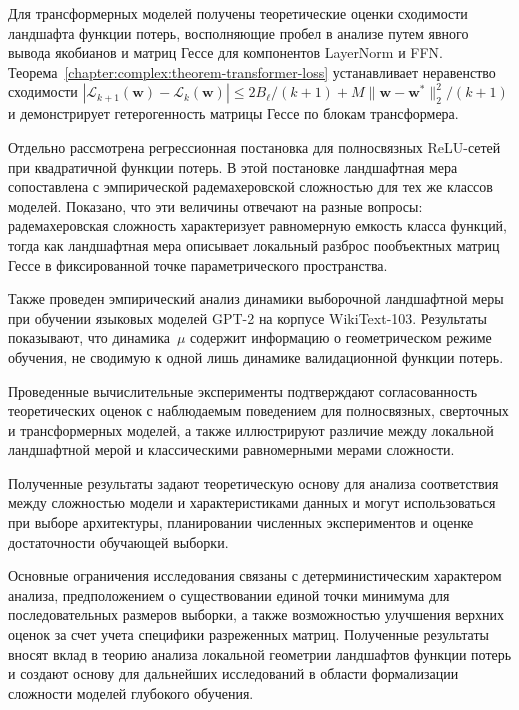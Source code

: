Для трансформерных моделей получены теоретические оценки сходимости ландшафта функции потерь, восполняющие пробел в анализе путем явного вывода якобианов и матриц Гессе для компонентов LayerNorm и FFN. Теорема~\ref{chapter:complex:theorem-transformer-loss} устанавливает неравенство сходимости $|\mathcal{L}_{k+1}(\mathbf{w})-\mathcal{L}_{k}(\mathbf{w})| \le 2B_{\ell}/(k+1) + M\|\mathbf{w}-\mathbf{w}^*\|_2^2/(k+1)$ и демонстрирует гетерогенность матрицы Гессе по блокам трансформера.

Отдельно рассмотрена регрессионная постановка для полносвязных ReLU-сетей при квадратичной функции потерь.
В этой постановке ландшафтная мера сопоставлена с эмпирической радемахеровской сложностью для тех же классов моделей.
Показано, что эти величины отвечают на разные вопросы: радемахеровская сложность характеризует равномерную емкость класса функций, тогда как ландшафтная мера описывает локальный разброс пообъектных матриц Гессе в фиксированной точке параметрического пространства.

Также проведен эмпирический анализ динамики выборочной ландшафтной меры при обучении языковых моделей GPT-2 на корпусе WikiText-103.
Результаты показывают, что динамика~$\mu$ содержит информацию о геометрическом режиме обучения, не сводимую к одной лишь динамике валидационной функции потерь.

Проведенные вычислительные эксперименты подтверждают согласованность теоретических оценок с наблюдаемым поведением для полносвязных, сверточных и трансформерных моделей, а также иллюстрируют различие между локальной ландшафтной мерой и классическими равномерными мерами сложности.

Полученные результаты задают теоретическую основу для анализа соответствия между сложностью модели и характеристиками данных и могут использоваться при выборе архитектуры, планировании численных экспериментов и оценке достаточности обучающей выборки.

Основные ограничения исследования связаны с детерминистическим характером анализа, предположением о существовании единой точки минимума для последовательных размеров выборки, а также возможностью улучшения верхних оценок за счет учета специфики разреженных матриц. Полученные результаты вносят вклад в теорию анализа локальной геометрии ландшафтов функции потерь и создают основу для дальнейших исследований в области формализации сложности моделей глубокого обучения.